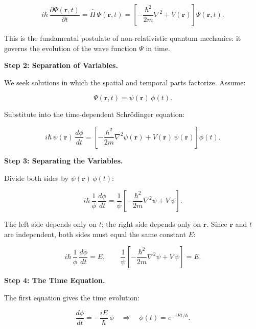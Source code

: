 \begin{equation}
i\hbar\,\frac{\partial \Psi(\mathbf{r}, t)}{\partial t} = \hat{H}\,\Psi(\mathbf{r}, t) = \left[-\frac{\hbar^2}{2m}\nabla^2 + V(\mathbf{r})\right]\Psi(\mathbf{r}, t).
\end{equation}

This is the fundamental postulate of non-relativistic quantum mechanics: it governs the evolution of the wave function $\Psi$ in time.

\textbf{Step 2: Separation of Variables.}

We seek solutions in which the spatial and temporal parts factorize. Assume:

\begin{equation}
\Psi(\mathbf{r}, t) = \psi(\mathbf{r})\,\phi(t).
\end{equation}

Substitute into the time-dependent Schr\"odinger equation:

\begin{equation}
i\hbar\,\psi(\mathbf{r})\,\frac{d\phi}{dt} = \left[-\frac{\hbar^2}{2m}\nabla^2\psi(\mathbf{r}) + V(\mathbf{r})\,\psi(\mathbf{r})\right]\phi(t).
\end{equation}

\textbf{Step 3: Separating the Variables.}

Divide both sides by $\psi(\mathbf{r})\,\phi(t)$:

\begin{equation}
i\hbar\,\frac{1}{\phi}\,\frac{d\phi}{dt} = \frac{1}{\psi}\left[-\frac{\hbar^2}{2m}\nabla^2\psi + V\,\psi\right].
\end{equation}

The left side depends only on $t$; the right side depends only on $\mathbf{r}$. Since $\mathbf{r}$ and $t$ are independent, both sides must equal the same constant $E$:

\begin{equation}
i\hbar\,\frac{1}{\phi}\,\frac{d\phi}{dt} = E, \qquad \frac{1}{\psi}\left[-\frac{\hbar^2}{2m}\nabla^2\psi + V\,\psi\right] = E.
\end{equation}

\textbf{Step 4: The Time Equation.}

The first equation gives the time evolution:

\begin{equation}
\frac{d\phi}{dt} = -\frac{iE}{\hbar}\,\phi \quad \Longrightarrow \quad \phi(t) = e^{-iEt/\hbar}.
\end{equation}

